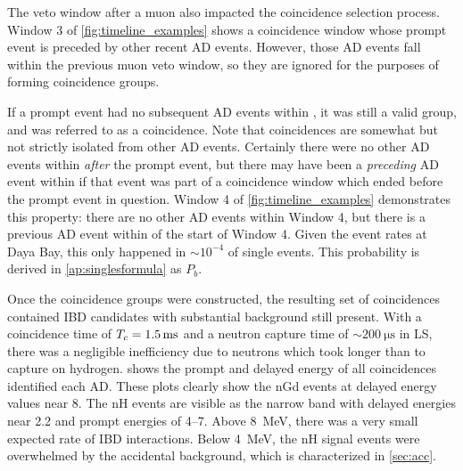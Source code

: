 The veto window after a muon also impacted the coincidence selection process.
Window 3 of \cref{fig:timeline_examples} shows a coincidence window
whose prompt event is preceded by other recent AD events.
However, those AD events fall within the previous muon veto window,
so they are ignored for the purposes of forming coincidence groups.

If a prompt event had no subsequent AD events within \tc, it was
still a valid group, and was referred to as a  coincidence.
Note that  coincidences are somewhat but not strictly isolated
from other AD events.
Certainly there were no other AD events
within \tc{} \textit{after} the prompt event,
but there may have been a \textit{preceding} AD event within \tc{}
if that event was part of a coincidence window
which ended before the prompt event in question.
Window 4 of \cref{fig:timeline_examples} demonstrates this property:
there are no other AD events within Window 4,
but there is a previous AD event within \tc{} of the start of Window 4.
Given the event rates at Daya Bay, this only happened in $\sim10^{-4}$
of single events.
This probability is derived in \cref{ap:singlesformula} as $P_b$.



Once the coincidence groups were constructed,
the resulting set of  coincidences
contained IBD candidates
with substantial background still present.
With a coincidence time of $\tc=\SI{1.5}{\ms}$
and a neutron capture time of $\sim\SI{200}{\us}$ in LS,
there was a negligible inefficiency due to neutrons
which took longer than \tc{} to capture on hydrogen.
 shows the prompt and delayed energy
of all  coincidences identified each AD.
These plots clearly show the nGd events
at delayed energy values near \SI{8}{\mev}.
The nH events are visible as the narrow band with
delayed energies near \SI{2.2}{\mev}
and prompt energies of \SIrange{4}{7}{\mev}.
Above \SI{8}{\MeV}, there was a very small expected rate of IBD interactions.
Below \SI{4}{\MeV},
the nH signal events were overwhelmed by the accidental background,
which is characterized in \cref{sec:acc}.

